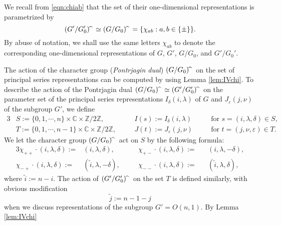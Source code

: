 We recall from \eqref{eqn:chiab}
 that the set of their one-dimensional representations
 is parametrized by 
\[
(G'/G_0')\hspace{-1mm}{\widehat{\hphantom{m}}} 
\simeq (G/G_0)\hspace{-1mm}{\widehat{\hphantom{m}}} 
           = \{\chi_{a b}: a, b \in \{\pm\}\}.  
\]
By abuse of notation,
 we shall use the same letters $\chi_{a b}$
 to denote the corresponding one-dimensional representations
 of $G$, $G'$, $G/G_0$, and $G'/G_0'$.  



The action of the character group 
 ({\it{Pontrjagin dual}})
 $(G/G_0)\hspace{-1mm}{\widehat{\hphantom{m}}}$
 on the set of principal series representations
 can be computed
 by using Lemma \ref{lem:IVchi}.  
To describe the action of the Pontrjagin dual 
 $(G/G_0)\hspace{-1mm}{\widehat{\hphantom{m}}} \simeq
  (G'/G_0')\hspace{-1mm}{\widehat{\hphantom{m}}}$
 on the parameter set of the principal series representations $I_{\delta}(i,\lambda)$ of $G$
 and $J_{\varepsilon}(j,\nu)$ of the subgroup $G'$, 
 we define
\begin{alignat*}{3}
   &S:=\{0,1,\cdots,n\} \times {\mathbb{C}} \times {\mathbb{Z}}/2{\mathbb{Z}}, 
 \quad
   &&I(s):=I_{\delta}(i,\lambda)
\quad
  &&\text{for } s =(i,\lambda,\delta)\in S, 
\\
   &T:=\{0,1,\cdots,n-1\} \times {\mathbb{C}} \times {\mathbb{Z}}/2{\mathbb{Z}}, \quad
   &&J(t):=J_{\varepsilon}(j,\nu)
\quad
  &&\text{for } t =(j,\nu,\varepsilon)\in T.   
\end{alignat*}
We let the character group $(G/G_0)\hspace{-1mm}{\widehat{\hphantom{m}}}$ act on $S$
 by the following formula:
\begin{alignat*}{3}
\chi_{++} \cdot (i,\lambda,\delta):=&(i,\lambda,\delta),
\quad
&&\chi_{+-} \cdot (i,\lambda,\delta):=&&(i,\lambda,-\delta),
\\
\chi_{-+} \cdot (i,\lambda,\delta):=&(\tilde i,\lambda,-\delta),
\quad
&&\chi_{--} \cdot (i,\lambda,\delta):=&&(\tilde i,\lambda,\delta),
\end{alignat*}
where $\tilde i:=n-i$.  
The action of $(G'/G_0')\hspace{-1mm}{\widehat{\hphantom{m}}}$ on the set $T$
 is defined similarly,
 with obvious modification
\[
\tilde j:=n-1-j
\]
 when we discuss representations
 of the subgroup $G'=O(n,1)$.  
By Lemma \ref{lem:IVchi}
